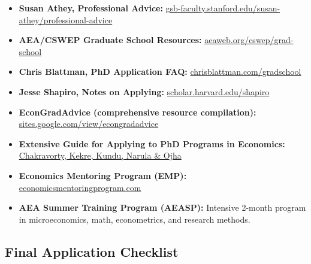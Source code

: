 \documentclass[11pt, letterpaper]{article}
\begin{document}
\begin{itemize}[leftmargin=*, itemsep=2pt]
    \item \textbf{Susan Athey, Professional Advice:} \href{https://gsb-faculty.stanford.edu/susan-athey/professional-advice/}{gsb-faculty.stanford.edu/susan-athey/professional-advice}
    \item \textbf{AEA/CSWEP Graduate School Resources:} \href{https://www.aeaweb.org/about-aea/committees/cswep/initiatives-and-resources/prof-dev-resources/grad-school}{aeaweb.org/cswep/grad-school}
    \item \textbf{Chris Blattman, PhD Application FAQ:} \href{https://chrisblattman.com/about/contact/gradschool/}{chrisblattman.com/gradschool}
    \item \textbf{Jesse Shapiro, Notes on Applying:} \href{https://scholar.harvard.edu/files/shapiro/files/phdnotes.pdf}{scholar.harvard.edu/shapiro}
    \item \textbf{EconGradAdvice (comprehensive resource compilation):} \href{https://sites.google.com/view/econgradadvice/}{sites.google.com/view/econgradadvice}
    \item \textbf{Extensive Guide for Applying to PhD Programs in Economics:} \href{https://drive.google.com/file/d/1cTb8enoUZxFKscidXYwojK3bXSjb7dxr}{Chakravorty, Kekre, Kundu, Narula \& Ojha}
\end{itemize}



\begin{itemize}[leftmargin=*, itemsep=2pt]
    \item \textbf{Economics Mentoring Program (EMP):} \href{https://www.economicsmentoringprogram.com/}{economicsmentoringprogram.com}
    \item \textbf{AEA Summer Training Program (AEASP):} Intensive 2-month program in microeconomics, math, econometrics, and research methods.
\end{itemize}

\newpage
\subsection{Final Application Checklist}
\end{document}
